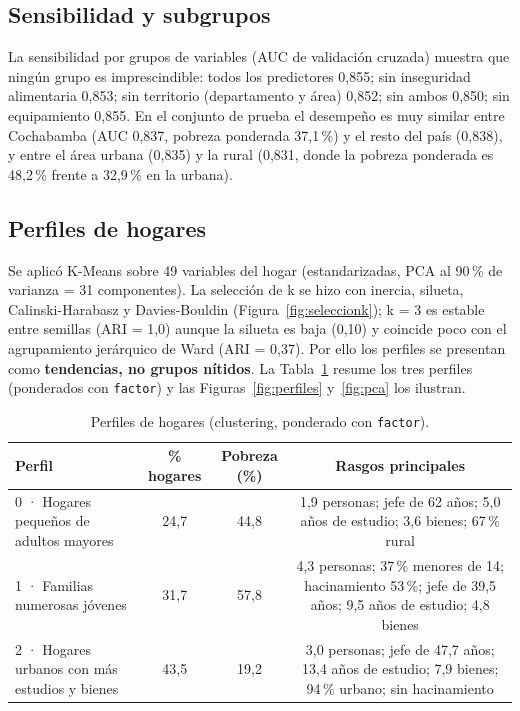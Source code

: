 \subsection{Sensibilidad y subgrupos}
La sensibilidad por grupos de variables (AUC de validación cruzada) muestra que ningún grupo es imprescindible: todos los predictores 0,855; sin inseguridad alimentaria 0,853; sin territorio (departamento y área) 0,852; sin ambos 0,850; sin equipamiento 0,855. En el conjunto de prueba el desempeño es muy similar entre Cochabamba (AUC 0,837, pobreza ponderada 37,1\,\%) y el resto del país (0,838), y entre el área urbana (0,835) y la rural (0,831, donde la pobreza ponderada es 48,2\,\% frente a 32,9\,\% en la urbana).

\subsection{Perfiles de hogares}
Se aplicó K-Means sobre 49 variables del hogar (estandarizadas, PCA al 90\,\% de varianza = 31 componentes). La selección de k se hizo con inercia, silueta, Calinski-Harabasz y Davies-Bouldin (Figura~\ref{fig:seleccionk}); k = 3 es estable entre semillas (ARI = 1,0) aunque la silueta es baja (0,10) y coincide poco con el agrupamiento jerárquico de Ward (ARI = 0,37). Por ello los perfiles se presentan como \textbf{tendencias, no grupos nítidos}. La Tabla~\ref{tab:perfiles} resume los tres perfiles (ponderados con \texttt{factor}) y las Figuras~\ref{fig:perfiles} y~\ref{fig:pca} los ilustran.

\begin{table}[ht]\centering\caption{Perfiles de hogares (clustering, ponderado con \texttt{factor}).}\label{tab:perfiles}
\begin{tabular}{lccc}\toprule
Perfil & \% hogares & Pobreza (\%) & Rasgos principales \\\midrule
0 · Hogares pequeños de adultos mayores & 24,7 & 44,8 & 1,9 personas; jefe de 62 años; 5,0 años de estudio; 3,6 bienes; 67\,\% rural \\
1 · Familias numerosas jóvenes & 31,7 & 57,8 & 4,3 personas; 37\,\% menores de 14; hacinamiento 53\,\%; jefe de 39,5 años; 9,5 años de estudio; 4,8 bienes \\
2 · Hogares urbanos con más estudios y bienes & 43,5 & 19,2 & 3,0 personas; jefe de 47,7 años; 13,4 años de estudio; 7,9 bienes; 94\,\% urbano; sin hacinamiento \\\bottomrule\end{tabular}\end{table}

